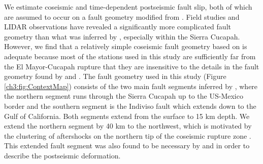 We estimate coseismic and time-dependent postseismic fault slip, both of which are assumed to occur on a fault geometry modified from \citet{Wei2011}.  Field studies \citep{Fletcher2014} and LIDAR observations \citep{Oskin2012} have revealed a significantly more complicated fault geometry than what was inferred by \citet{Wei2011}, especially within the Sierra Cucapah.  However, we find that a relatively simple coseismic fault geometry based on \citep{Wei2011} is adequate because most of the stations used in this study are sufficiently far from the El Mayor-Cucapah rupture that they are insensitive to the details in the fault geometry found by \citet{Fletcher2014} and \citet{Oskin2012}.  The fault geometry used in this study (Figure \ref{ch3:fig:ContextMap}) consists of the two main fault segments inferred by \citet{Wei2011}, where the northern segment runs through the Sierra Cucapah up to the US-Mexico border and the southern segment is the Indiviso fault which extends down to the Gulf of California. Both segments extend from the surface to 15 km depth.  We extend the northern segment by 40 km to the northwest, which is motivated by the clustering of aftershocks on the northern tip of the coseismic rupture zone \citep{Hauksson2011,Kroll2013}.  This extended fault segment was also found to be necessary by \citet{Rollins2015} and \citet{Pollitz2012} in order to describe the postseismic deformation. 

